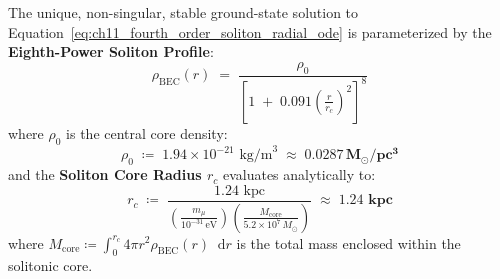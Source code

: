 \documentclass[
    12pt,
    a4paper,
    headings=normal,
    twoside=false,
    open=any,
    parskip=half
]{scrbook}
\newcommand{\diff}{\mathop{}\!\mathrm{d}}
\begin{document}
\begin{phystheorem}\label{thm:ch11_soliton_density_profile_theorem}
The unique, non-singular, stable ground-state solution to Equation~\eqref{eq:ch11_fourth_order_soliton_radial_ode} is parameterized by the \textbf{Eighth-Power Soliton Profile}:
\begin{equation}
\boxed{\rho_{\text{BEC}}(r) \;=\; \frac{\rho_0}{\left[ 1 \;+\; 0.091 \left( \frac{r}{r_c} \right)^2 \right]^8}}
\label{eq:ch11_soliton_profile_master_formula}
\end{equation}
where $\rho_0$ is the central core density:
\begin{equation}
\rho_0 \;\coloneqq\; 1.94 \times 10^{-21} \text{ kg/m}^3 \;\approx\; \mathbf{0.0287 \, M_\odot / \text{pc}^3}
\label{eq:ch11_central_core_density_value}
\end{equation}
and the \textbf{Soliton Core Radius $r_c$} evaluates analytically to:
\begin{equation}
\boxed{r_c \;\coloneqq\; \frac{1.24 \text{ kpc}}{\left( \frac{m_\mu}{10^{-31}\,\text{eV}} \right) \left( \frac{M_{\text{core}}}{5.2 \times 10^7 \, M_\odot} \right)} \;\approx\; \mathbf{1.24 \text{ kpc}}}
\label{eq:ch11_soliton_core_radius_master}
\end{equation}
where $M_{\text{core}} \coloneqq \int_0^{r_c} 4\pi r^2 \rho_{\text{BEC}}(r)\diff r$ is the total mass enclosed within the solitonic core.
\end{phystheorem}
\end{document}
